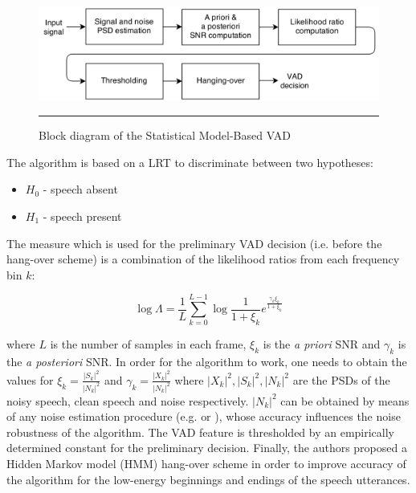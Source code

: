 \begin{figure}[htbp]
	\centering
		\includegraphics[width=0.9\columnwidth]{Figures/Chapter2/Sohn.png}
		\rule{37em}{0.5pt}
	\caption[Block diagram of the Statistical Model-Based VAD]{Block diagram of the Statistical Model-Based VAD \cite{Sohn}}
	\label{fig:Sohn}
\end{figure}

The algorithm is based on a LRT to discriminate between two hypotheses:
\begin{itemize}
\item[] $H_0$ - speech absent
\item[] $H_1$ - speech present
\end{itemize}

The measure which is used for the preliminary VAD decision (i.e. before the hang-over scheme) is a combination of the likelihood ratios from each frequency bin $k$:

\begin{equation}
\log \Lambda = \frac{1}{L} \sum_{k=0}^{L-1} \log \frac{1}{1+\xi_k} e^{\frac{\gamma_k\xi_k}{1+\xi_k}}
\end{equation}

where $L$ is the number of samples in each frame, $\xi_k$ is the \emph{a priori} SNR and $\gamma_k$ is the \emph{a posteriori} SNR. In order for the algorithm to work, one needs to obtain the values for $\xi_k = \frac{\left | S_k \right |^{2}}{\left | N_k \right |^{2}}$ and $\gamma_k = \frac{\left | X_k \right |^{2}}{\left | N_k \right |^{2}}$ where $\left | X_k \right |^{2}, \left | S_k \right |^{2}, \left | N_k \right |^{2}$ are the PSDs of the noisy speech, clean speech and noise respectively. $\left | N_k \right |^{2}$ can be obtained by means of any noise estimation procedure (e.g. \cite{MSnoise} or \cite{MMSEnoise}), whose accuracy influences the noise robustness of the algorithm. The VAD feature is thresholded by an empirically determined constant for the preliminary decision. Finally, the authors proposed a Hidden Markov model (HMM) hang-over scheme in order to improve accuracy of the algorithm for the low-energy beginnings and endings of the speech utterances.

